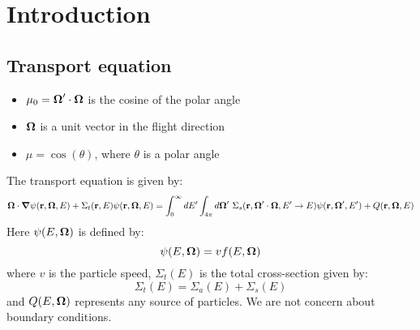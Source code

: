 \chapter{Introduction}
\section{Transport equation}
\begin{itemize}
\item $\mu_0 = \boldsymbol{\Omega}'\cdot \boldsymbol{\Omega}$ is the cosine of the polar angle
\item $\boldsymbol{\Omega}$ is a unit vector in the flight direction
\item $\mu = \cos(\theta)$, where $\theta$ is a polar angle
\end{itemize}
The transport equation is given by:
\begin{equation}
\bo\cdot \bn \psi(\br,\bo,E) + \Sigma_t(\br,E)\psi(\br,\bo,E) =
\int_0^{\infty}dE'\int_{4\pi}d\bo'\ 
\Sigma_s(\br,\bo'\cdot\bo,E'\rightarrow E)\psi(\br,\bo',E')+Q(\br,\bo,E)
\label{transport_p}
\end{equation}
Here $\psi(E,\boldsymbol{\Omega})$ is defined by:
\begin{equation}
\psi(E,\boldsymbol{\Omega}) = vf(E,\boldsymbol{\Omega})
\end{equation}
where $v$ is the particle speed, $\Sigma_t(E)$ is the total cross-section
given by:
\begin{equation}
\Sigma_t(E) = \Sigma_a(E)+\Sigma_s(E)
\end{equation}
and $Q(E,\boldsymbol{\Omega})$ represents any source of particles. We are not concern about
boundary conditions.

